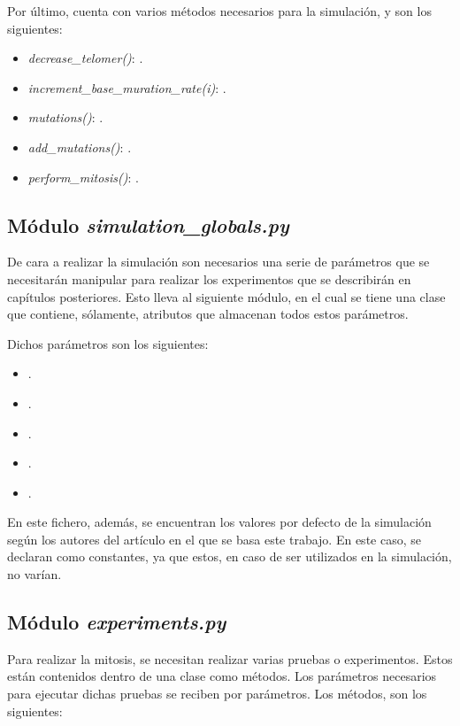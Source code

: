 Por último, cuenta con varios métodos necesarios para la simulación, y son los siguientes:

\begin{itemize}
    \item \textit{decrease\_telomer()}: .
    \item \textit{increment\_base\_muration\_rate(i)}: .
    \item \textit{mutations()}: .
    \item \textit{add\_mutations()}: .
    \item \textit{perform\_mitosis()}: .
\end{itemize}

\subsection{Módulo \textit{simulation\_globals.py}}

De cara a realizar la simulación son necesarios una serie de parámetros que se necesitarán manipular
para realizar los experimentos que se describirán en capítulos posteriores. Esto lleva al siguiente módulo,
en el cual se tiene una clase que contiene, sólamente, atributos que almacenan todos estos parámetros.

Dichos parámetros son los siguientes:

\begin{itemize}
    \item .
    \item .
    \item .
    \item .
    \item .
\end{itemize}

En este fichero, además, se encuentran los valores por defecto de la simulación según los autores
del artículo \cite{jsantos-amonteagudo-1-2014} en el que se basa este trabajo. En este caso,
se declaran como constantes, ya que estos, en caso de ser utilizados en la simulación, no varían.

\subsection{Módulo \textit{experiments.py}}

Para realizar la mitosis, se necesitan realizar varias pruebas o experimentos. Estos
están contenidos dentro de una clase como métodos. Los parámetros necesarios para ejecutar dichas
pruebas se reciben por parámetros. Los métodos, son los siguientes:

